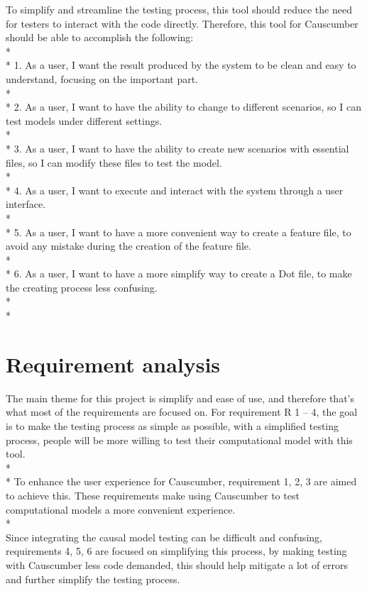 To simplify and streamline the testing process, this tool should reduce the need for testers to interact with the code directly. Therefore, this tool for Causcumber should be able to accomplish the following:\\*
\\*
1. As a user, I want the result produced by the system to be clean and easy to understand, focusing on the important part.\\*
\\*
2. As a user, I want to have the ability to change to different scenarios, so I can test models under different settings.\\*
\\*
3. As a user, I want to have the ability to create new scenarios with essential files, so I can modify these files to test the model.\\*
\\*
4. As a user, I want to execute and interact with the system through a user interface.\\*
\\*
5. As a user, I want to have a more convenient way to create a feature file, to avoid any mistake during the creation of the feature file.\\*
\\*
6. As a user, I want to have a more simplify way to create a Dot file, to make the creating process less confusing. \\*
\\*

\section{Requirement analysis}
The main theme for this project is simplify and ease of use, and therefore that’s what most of the requirements are focused on. For requirement R 1 – 4, the goal is to make the testing process as simple as possible, with a simplified testing process, people will be more willing to test their computational model with this tool. \\*\\*
To enhance the user experience for Causcumber, requirement 1, 2, 3 are aimed to achieve this. These requirements make using Causcumber to test computational models a more convenient experience. \\*\\
Since integrating the causal model testing can be difficult and confusing, requirements 4, 5, 6 are focused on simplifying this process, by making testing with Causcumber less code demanded, this should help mitigate a lot of errors and further simplify the testing process. 


